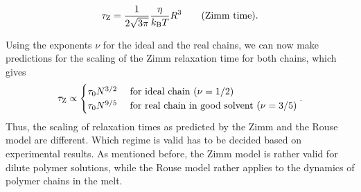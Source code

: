 \documentclass[letterpaper,10pt,english]{sphinxmanual}
\begin{document}
\sphinxAtStartPar
\begin{equation}
\tau_{\rm Z}=\frac{1}{2 \sqrt{3 \pi}} \frac{\eta}{k_{\rm B} T} R^{3}\tag{Zimm time}.
\end{equation}

\sphinxAtStartPar
Using the exponents \(\nu\) for the ideal and the real chains, we can now make predictions for the scaling of the Zimm relaxation time for both chains, which gives
\begin{equation*}
\begin{split}\tau_{\rm Z} \propto \begin{cases}\tau_{0} N^{3 / 2}  & \text { for ideal chain }(\nu=1 / 2) \\ \tau_{0} N^{9 / 5}  & \text { for real chain in good solvent }(\nu=3 / 5)\end{cases}.\end{split}
\end{equation*}
\sphinxAtStartPar
Thus, the scaling of relaxation times as predicted by the Zimm and the Rouse model are different. Which regime is valid has to be decided based on experimental results. As mentioned before, the Zimm model is rather valid for dilute polymer solutions, while the Rouse model rather applies to the dynamics of polymer chains in the melt.
\end{document}
